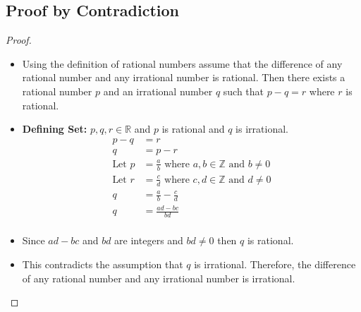 \documentclass{article}
\begin{document}
\subsection*{Proof by Contradiction}
\begin{proof}
    \begin{itemize}
        \item[]Using the definition of rational numbers assume that the difference of any rational number and any irrational number is rational. Then there exists a rational number $p$ and an irrational number $q$ such that $p - q = r$ where $r$ is rational.
        \item[] \textbf{Defining Set: }$p, q, r \in \mathbb{R}$ and $p$ is rational and $q$ is irrational.
        \begin{align*}
            p - q &= r \\
            q &= p - r \\
            \text{Let } p &= \frac{a}{b} \text{ where } a, b \in \mathbb{Z} \text{ and } b \neq 0 \\
            \text{Let } r &= \frac{c}{d} \text{ where } c, d \in \mathbb{Z} \text{ and } d \neq 0 \\
            q &= \frac{a}{b} - \frac{c}{d} \\
            q &= \frac{ad - bc}{bd} \\
        \end{align*}
        \item[] Since $ad - bc$ and $bd$ are integers and $bd \neq 0$ then $q$ is rational. 
        \item[] This contradicts the assumption that $q$ is irrational. Therefore, the difference of any rational number and any irrational number is irrational.
    \end{itemize}
    \end{proof}
\end{document}
